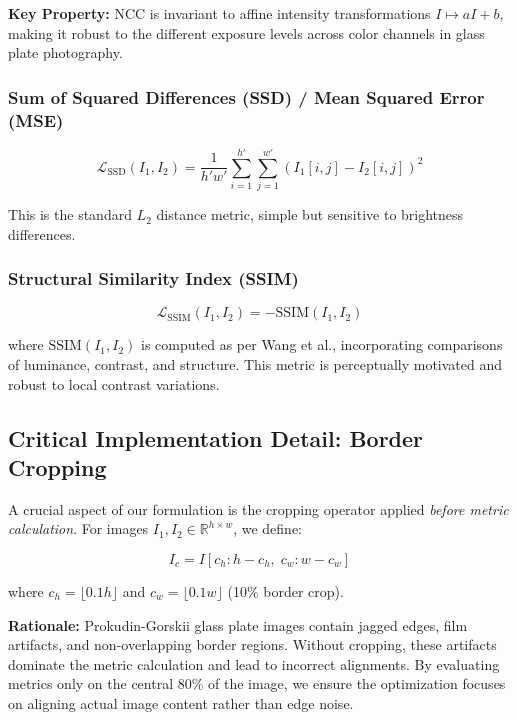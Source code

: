 \documentclass[11pt]{article}
\begin{document}
\textbf{Key Property:} NCC is invariant to affine intensity transformations $I \mapsto aI + b$, making it robust to the different exposure levels across color channels in glass plate photography.

\subsubsection{Sum of Squared Differences (SSD) / Mean Squared Error (MSE)}

\begin{equation}
\mathcal{L}_{\text{SSD}}(I_1, I_2) = \frac{1}{h'w'}\sum_{i=1}^{h'} \sum_{j=1}^{w'} (I_1[i,j] - I_2[i,j])^2
\end{equation}

This is the standard $L_2$ distance metric, simple but sensitive to brightness differences.

\subsubsection{Structural Similarity Index (SSIM)}

\begin{equation}
\mathcal{L}_{\text{SSIM}}(I_1, I_2) = -\text{SSIM}(I_1, I_2)
\end{equation}

where $\text{SSIM}(I_1, I_2)$ is computed as per Wang et al., incorporating comparisons of luminance, contrast, and structure. This metric is perceptually motivated and robust to local contrast variations.

\subsection{Critical Implementation Detail: Border Cropping}

A crucial aspect of our formulation is the cropping operator applied \emph{before metric calculation}. For images $I_1, I_2 \in \mathbb{R}^{h \times w}$, we define:

\begin{equation}
I_c = I[c_h : h-c_h, \; c_w : w-c_w]
\end{equation}

where $c_h = \lfloor 0.1h \rfloor$ and $c_w = \lfloor 0.1w \rfloor$ (10\% border crop).

\textbf{Rationale:} Prokudin-Gorskii glass plate images contain jagged edges, film artifacts, and non-overlapping border regions. Without cropping, these artifacts dominate the metric calculation and lead to incorrect alignments. By evaluating metrics only on the central 80\% of the image, we ensure the optimization focuses on aligning actual image content rather than edge noise.
\end{document}
